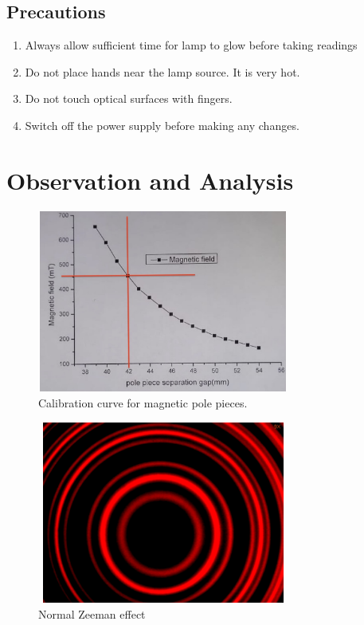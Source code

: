 \documentclass[a4paper, amsfonts, amssymb, amsmath, reprint, showkeys, nofootinbib, twoside]{revtex4-1}
\begin{document}
\subsection{Precautions}
\begin{enumerate}
	\item {Always allow sufficient time for lamp to glow before taking readings}
	\item {Do not place hands near the lamp source. It is very hot. }
	\item {Do not touch optical surfaces with fingers.}
	\item {Switch off the power supply before making any changes.}
\end{enumerate}


\section{Observation and Analysis}
\begin{figure}[H] %
	\centering
	\includegraphics[width=8.3cm,height=6cm]{3} 
	\caption{Calibration curve for magnetic pole pieces.}
	\label{3}
\end{figure}

\begin{figure}[H] %
	\centering
	\includegraphics[width=8.3cm,height=6cm]{4} 
	\caption{Normal Zeeman effect}
	\label{4}
\end{figure}
\end{document}

